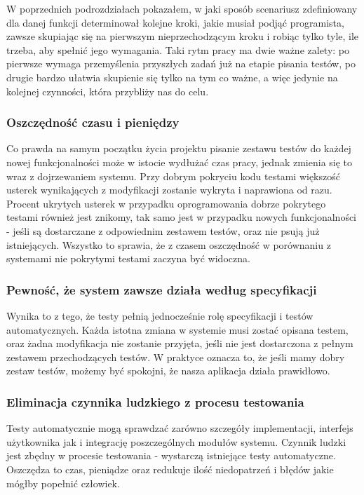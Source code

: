   W poprzednich podrozdziałach pokazałem, w jaki sposób scenariusz zdefiniowany dla danej funkcji determinował kolejne kroki, jakie musiał podjąć programista, zawsze skupiając się na pierwszym nieprzechodzącym kroku i robiąc tylko tyle, ile trzeba, aby spełnić jego wymagania. Taki rytm pracy ma dwie ważne zalety: po pierwsze wymaga przemyślenia przyszłych zadań już na etapie pisania testów, po drugie bardzo ułatwia skupienie się tylko na tym co ważne, a więc jedynie na kolejnej czynności, która przybliży nas do celu.
    
  \subsubsection{Oszczędność czasu i pieniędzy}
  Co prawda na samym początku życia projektu pisanie zestawu testów do każdej nowej funkcjonalności może w istocie wydłużać czas pracy, jednak zmienia się to wraz z dojrzewaniem systemu. Przy dobrym pokryciu kodu testami większość usterek wynikających z modyfikacji zostanie wykryta i naprawiona od razu. Procent ukrytych usterek w przypadku oprogramowania dobrze pokrytego testami również jest znikomy, tak samo jest w przypadku nowych funkcjonalności - jeśli są dostarczane z odpowiednim zestawem testów, oraz nie psują już istniejących. Wszystko to sprawia, że z czasem oszczędność w porównaniu z systemami nie pokrytymi testami zaczyna być widoczna.
  
  \subsubsection{Pewność, że system zawsze działa według specyfikacji}
  Wynika to z tego, że testy pełnią jednocześnie rolę specyfikacji i testów automatycznych. Każda istotna zmiana w systemie musi zostać opisana testem, oraz żadna modyfikacja nie zostanie przyjęta, jeśli nie jest dostarczona z pełnym zestawem przechodzących testów. W praktyce oznacza to, że jeśli mamy dobry zestaw testów, możemy być spokojni, że nasza aplikacja działa prawidłowo.
  
  \subsubsection{Eliminacja czynnika ludzkiego z procesu testowania}
  Testy automatycznie mogą sprawdzać zarówno szczegóły implementacji, interfejs użytkownika jak i integrację poszczególnych modułów systemu. Czynnik ludzki jest zbędny w procesie testowania - wystarczą istniejące testy automatyczne. Oszczędza to czas, pieniądze oraz redukuje ilość niedopatrzeń i błędów jakie mógłby popełnić człowiek.
    
